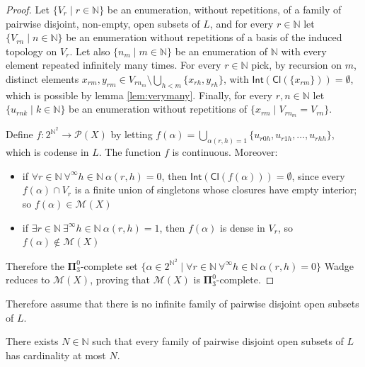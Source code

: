 \documentclass{lmcs}
\newcommand{\N}{\mathbb N}
\newcommand{\bpi}{\boldsymbol\Pi}
\newcommand{\Cl}[1]{\mathsf{Cl}(#1)}
\newcommand{\Int}[1]{\mathsf{Int}(#1)}
\begin{document}
\begin{proof}
Let $\{ V_r\mid r\in \N \} $ be an enumeration, without repetitions, of a family of pairwise disjoint, non-empty, open subsets of $L$, and for every $r\in \N $ let $\{ V_{rn}\mid n\in \N \} $ be an enumeration without repetitions of a basis of the induced topology on $V_r$.
Let also $\{ n_m\mid m\in \N \} $ be an enumeration of $ \N $ with every element repeated infinitely many times.
For every $r\in \N $ pick, by recursion on $m$, distinct elements $x_{rm},y_{rm}\in V_{rn_m}\setminus\bigcup_{h<m}\{ x_{rh},y_{rh}\} $, with $ \Int{ \Cl{\{ x_{rm}\} } } =\emptyset $, which is possible by lemma \ref{lem:verymany}.
Finally, for every $r,n\in \N $ let $\{ u_{rnk}\mid k\in \N \} $ be an enumeration without repetitions of $\{ x_{rm}\mid V_{rn_m}=V_{rn}\} $.

Define $f:2^{ \N^2}\to \mathcal P (X)$ by letting $f(\alpha )=\bigcup_{\alpha (r,h)=1}\{ u_{r0h},u_{r1h},\ldots ,u_{rhh}\} $, which is codense in $L$.
The function $f$ is continuous.
Moreover:
\begin{itemize}
\item if $\forall r\in \N \ \forall^{\infty }h\in \N \ \alpha (r,h)=0$, then $ \Int{ \Cl{f(\alpha )} } =\emptyset $, since every $f(\alpha )\cap V_r$ is a finite union of singletons whose closures have empty interior; so $f(\alpha )\in \mathcal M (X)$
\item if $\exists r\in \N \ \exists^{\infty }h\in \N \ \alpha (r,h)=1$, then $f(\alpha )$ is dense in $V_r$, so $f(\alpha )\notin \mathcal M (X)$
\end{itemize}
Therefore the $ \bpi^0_3$-complete set $\{\alpha\in 2^{ \N^2}\mid\forall r\in \N \ \forall^{\infty }h\in \N \ \alpha (r,h)=0\} $ Wadge reduces to $ \mathcal M (X)$, proving that $ \mathcal M (X)$ is $ \bpi^0_3$-complete.
\end{proof}

Therefore assume that there is no infinite family of pairwise disjoint open subsets of $L$.

\begin{lem}
There exists $N\in \N $ such that every family of pairwise disjoint open subsets of $L$ has cardinality at most $N$.
\end{lem}
\end{document}
